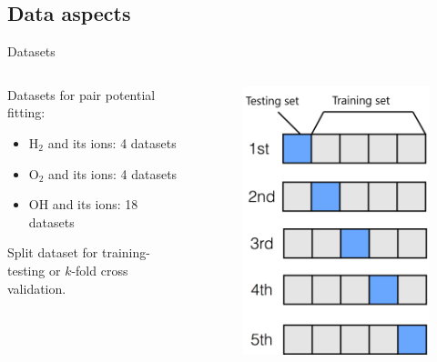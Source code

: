 \documentclass{beamer}
\begin{document}
\subsection{Data aspects}
\begin{frame}{Datasets}
    \begin{columns}
        \begin{column}{0.5\textwidth}
            Datasets for pair potential fitting:
            \begin{itemize}
                \item H$_2$ and its ions: 4 datasets
                \item O$_2$ and its ions: 4 datasets
                \item OH and its ions: 18 datasets
            \end{itemize}
            
            Split dataset for training-testing or $k$-fold cross validation.
        \end{column}
        \begin{column}{0.5\textwidth}
            \begin{figure}[h]
                \centering
                \includegraphics[scale=0.3]{img/slide/kfold2.png}
                \label{fig:kfold}
            \end{figure}
        \end{column}
    \end{columns}
    
    
    
\end{frame}
\end{document}
